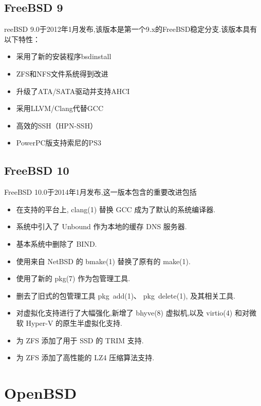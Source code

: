 \documentclass[a4paper,12pt,notitlepage]{article}
\begin{document}
\subsection{FreeBSD 9}

reeBSD 9.0于2012年1月发布,该版本是第一个9.x的FreeBSD稳定分支.该版本具有以下特性： \\

\begin{itemize}
    \item 采用了新的安装程序bsdinstall
    \item ZFS和NFS文件系统得到改进
    \item 升级了ATA/SATA驱动并支持AHCI
    \item 采用LLVM/Clang代替GCC
    \item 高效的SSH（HPN-SSH）
    \item PowerPC版支持索尼的PS3
\end{itemize}

\subsection{FreeBSD 10}

	FreeBSD 10.0于2014年1月发布,这一版本包含的重要改进包括 \\
	
\begin{itemize}
	
    \item 在支持的平台上, clang(1) 替换 GCC 成为了默认的系统编译器.
    \item 系统中引入了 Unbound 作为本地的缓存 DNS 服务器.
    \item 基本系统中删除了 BIND.
    \item 使用来自 NetBSD 的 bmake(1) 替换了原有的 make(1).
    \item 使用了新的 pkg(7) 作为包管理工具.
    \item 删去了旧式的包管理工具 pkg\ add(1)、 pkg\ delete(1), 及其相关工具.
    \item 对虚拟化支持进行了大幅强化,新增了 bhyve(8) 虚拟机,以及 virtio(4) 和对微软 Hyper-V 的原生半虚拟化支持.
    \item 为 ZFS 添加了用于 SSD 的 TRIM 支持.
    \item 为 ZFS 添加了高性能的 LZ4 压缩算法支持.

\end{itemize}
	
\section{OpenBSD}
\end{document}
